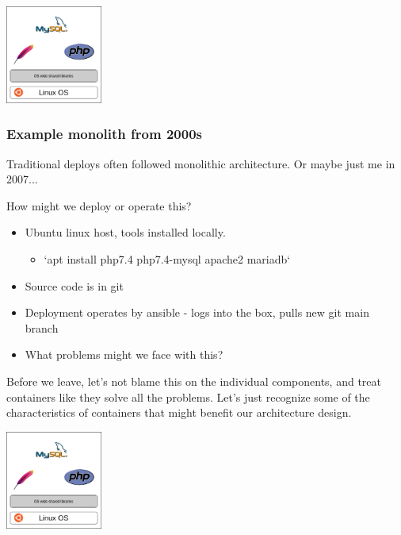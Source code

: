 \documentclass[11pt]{beamer}
\begin{document}
\begin{frame}
  \begin{center}
    \includegraphics[width=120px,keepaspectratio]{LAMP}
  \end{center}
\end{frame}

\begin{frame}
  \frametitle{Example monolith from 2000s}
  Traditional deploys often followed monolithic architecture. Or maybe just me in 2007...

  How might we deploy or operate this?
  \begin{itemize}
    \item Ubuntu linux host, tools installed locally.
    \begin{itemize}
      \item `apt install php7.4 php7.4-mysql apache2 mariadb`
    \end{itemize}
    \item Source code is in git
    \item Deployment operates by ansible - logs into the box, pulls new git main branch
    \item What problems might we face with this?
  \end{itemize}
  Before we leave, let's not blame this on the individual components, and treat containers like
  they solve all the problems. Let's just recognize some of the characteristics of containers
  that might benefit our architecture design.

\end{frame}

\begin{frame}
  \begin{center}
    \includegraphics[width=120px,keepaspectratio]{LAMP}
  \end{center}
\end{frame}
\end{document}
